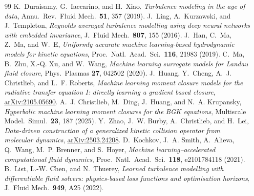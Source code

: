 \begin{thebibliography}{99}
K.~Duraisamy, G.~Iaccarino, and H.~Xiao,
\emph{Turbulence modeling in the age of data},
Annu.\ Rev.\ Fluid Mech.\ \textbf{51}, 357 (2019).
J.~Ling, A.~Kurzawski, and J.~Templeton,
\emph{Reynolds averaged turbulence modelling using deep neural networks
with embedded invariance},
J.\ Fluid Mech.\ \textbf{807}, 155 (2016).
J.~Han, C.~Ma, Z.~Ma, and W.~E,
\emph{Uniformly accurate machine learning-based hydrodynamic models for
kinetic equations},
Proc.\ Natl.\ Acad.\ Sci.\ \textbf{116}, 21983 (2019).
C.~Ma, B.~Zhu, X.-Q. Xu, and W.~Wang,
\emph{Machine learning surrogate models for Landau fluid closure},
Phys.\ Plasmas \textbf{27}, 042502 (2020).
J.~Huang, Y.~Cheng, A.~J. Christlieb, and L.~F. Roberts,
\emph{Machine learning moment closure models for the radiative transfer
equation I: directly learning a gradient based closure},
\href{https://arxiv.org/abs/2105.05690}{arXiv:2105.05690}.
A.~J. Christlieb, M.~Ding, J.~Huang, and N.~A. Krupansky,
\emph{Hyperbolic machine learning moment closures for the BGK equations},
Multiscale Model.\ Simul.\ \textbf{23}, 187 (2025).
Y.~Zhao, J.~W. Burby, A.~Christlieb, and H.~Lei,
\emph{Data-driven construction of a generalized kinetic collision operator
from molecular dynamics},
\href{https://arxiv.org/abs/2503.24208}{arXiv:2503.24208}.
D.~Kochkov, J.~A. Smith, A.~Alieva, Q.~Wang, M.~P. Brenner, and S.~Hoyer,
\emph{Machine learning--accelerated computational fluid dynamics},
Proc.\ Natl.\ Acad.\ Sci.\ \textbf{118}, e2101784118 (2021).
B.~List, L.-W. Chen, and N.~Thuerey,
\emph{Learned turbulence modelling with differentiable fluid solvers:
physics-based loss functions and optimisation horizons},
J.\ Fluid Mech.\ \textbf{949}, A25 (2022).

\end{thebibliography}
